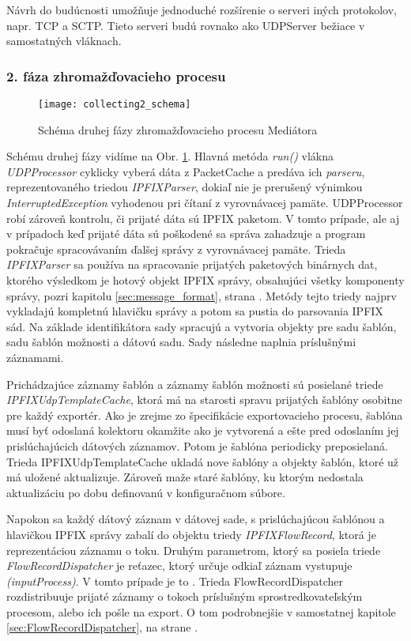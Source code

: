 Návrh do budúcnosti umožňuje jednoduché rozšírenie o serveri iných protokolov, napr. TCP a SCTP. 
Tieto serveri budú rovnako ako UDPServer bežiace v samostatných vláknach.

\subsubsection{2. fáza zhromažďovacieho procesu}

\begin{figure}[ht!]
\centering
\texttt{[image: collecting2\_schema]}
\caption{Schéma druhej fázy zhromažďovacieho procesu Mediátora}\label{o:collecting2_schema}
\end{figure}

Schému druhej fázy vidíme na Obr. \ref{o:collecting2_schema}. Hlavná metóda \emph{run()} vlákna 
\emph{UDPProcessor} cyklicky vyberá dáta z PacketCache a predáva ich \emph{parseru}, reprezentovaného 
triedou \emph{IPFIXParser}, dokiaľ nie je prerušený výnimkou \emph{InterruptedException} vyhodenou pri 
čítaní z vyrovnávacej pamäte.
UDPProcessor robí zároveň kontrolu, či prijaté dáta sú IPFIX paketom. V tomto prípade, ale aj v prípadoch
keď prijaté dáta sú poškodené sa správa zahadzuje a program pokračuje spracovávaním ďalšej správy z 
vyrovnávacej pamäte.
Trieda \emph{IPFIXParser} sa používa na spracovanie prijatých paketových binárnych dat, ktorého 
výsledkom je hotový objekt IPFIX správy, obsahujúci všetky komponenty správy, pozri kapitolu 
\ref{sec:message_format}, strana \pageref{sec:message_format}. Metódy tejto triedy najprv vykladajú 
kompletnú hlavičku správy a potom sa pustia do parsovania IPFIX sád. Na základe identifikátora sady 
spracujú a vytvoria objekty pre sadu šablón, sadu šablón možnosti a dátovú sadu. Sady následne naplnia 
príslušnými záznamami. 

Prichádzajúce záznamy šablón a záznamy šablón možnosti sú posielané triede 
\emph{IPFIXUdpTemplateCache}, ktorá má na starosti spravu prijatých šablóny osobitne pre každý exportér. 
Ako je zrejme zo špecifikácie exportovacieho procesu, šablóna musí byť odoslaná kolektoru okamžite ako je 
vytvorená a ešte pred odoslaním jej prislúchajúcich dátových záznamov. Potom je šablóna periodicky 
preposielaná. Trieda IPFIXUdpTemplateCache ukladá nove šablóny a objekty šablón, ktoré už má uložené 
aktualizuje. Zároveň maže staré šablóny, ku ktorým nedostala aktualizáciu po dobu definovanú v 
konfiguračnom súbore.

Napokon sa každý dátový záznam v dátovej sade, s prislúchajúcou šablónou a hlavičkou IPFIX správy 
zabalí do objektu triedy \emph{IPFIXFlowRecord}, ktorá je reprezentáciou záznamu o toku. 
Druhým parametrom, ktorý sa posiela triede \emph{FlowRecordDispatcher} je 
reťazec, ktorý určuje odkiaľ záznam vystupuje \emph{(inputProcess)}. V tomto prípade je to 
\emph{}. 
Trieda FlowRecordDispatcher rozdistribuuje prijaté záznamy o tokoch príslušným 
sprostredkovateľským procesom, alebo ich pošle na export. O tom podrobnejšie v samostatnej kapitole
\ref{sec:FlowRecordDispatcher}, na strane \pageref{sec:FlowRecordDispatcher}. 


